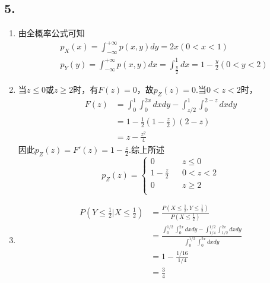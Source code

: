 \documentclass[twocolumn]{article}
\begin{document}
\begin{CJK}{UTF8}{gbsn}
				\subsection*{5.}
					\begin{enumerate}[(1)]
						\item 由全概率公式可知\begin{align*}
							& p_X(x)=\int_{-\infty}^{+\infty}p(x,y)dy=2x(0<x<1)\\
							& p_Y(y)=\int_{-\infty}^{+\infty}p(x,y)dx=\int_{\frac{y}{2}}^{1}dx=1-\frac{y}{2}(0<y<2)
						\end{align*}
						\item 当$z\le0$或$z\ge2$时，有$F(z)=0$，故$p_Z(z)=0$.当$0<z<2$时，\begin{align*}
							F(z) & =\int_{0}^{1}\int_{0}^{2x}dxdy-\int_{z/2}^{1}\int_{0}^{2-z}dxdy\\
							 & = 1-\frac{1}{2}(1-\frac{z}{2})(2-z) \\
							 & = z-\frac{z^2}{4}
						\end{align*}
						因此$p_Z(z)=F'(z)=1-\frac{z}{2}$.综上所述\begin{equation*}
						p_Z(z)=\left\{
						\begin{array}{rcl}
						0 & & {z\le0}\\
						1-\frac{z}{2} & & {0<z<2}\\
						0 & & {z\ge2}\\
						\end{array} \right.
						\end{equation*}
						\item \begin{align*}
							P(Y\le\frac{1}{2}|X\le\frac{1}{2}) & = \frac{P(X\le\frac{1}{2}, Y\le\frac{1}{2})}{P(X\le\frac{1}{2})}\\
							& = \frac{\int_{0}^{1/2}\int_{0}^{2x}dxdy-\int_{1/4}^{1/2}\int_{1/2}^{2x}dxdy}{\int_{0}^{1/2}\int_{0}^{2x}dxdy} \\
							& = 1-\frac{1/16}{1/4}\\
							& = \frac{3}{4}
						\end{align*}
					\end{enumerate}

\end{CJK}
\end{document}
